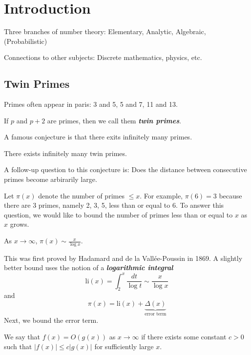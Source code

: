 



\section{Introduction}

Three branches of number theory: Elementary, Analytic, Algebraic, (Probabilistic)

Connections to other subjects: Discrete mathematics, physics, etc.

\subsection{Twin Primes}

Primes often appear in paris: 3 and 5, 5 and 7, 11 and 13.

\begin{definition}
    If $p$ and $p+2$ are primes, then we call them \textit{\textbf{twin primes}}.
\end{definition}

A famous conjecture is that there exits infinitely many primes.

\begin{conjecture}
    There exists infinitely many twin primes.
\end{conjecture}

A follow-up question to this conjecture is: Does the distance between consecutive primes become arbirarily large.

Let $\pi(x)$ denote the number of primes $\leq x$. For example, $\pi(6)=3$ because there are 3 primes, namely 2, 3, 5, less than or equal to 6. To answer this question, we would like to bound the number of primes less than or equal to $x$ as $x$ grows.

\begin{theorem}
    As $x \to \infty$, $\pi(x) \sim \frac{x}{\log x}$.
\end{theorem}

This was first proved by Hadamard and de la Vall\'ee-Poussin in 1869. A slightly better bound uses the notion of a \textit{\textbf{logarithmic integral}}
$$
\mathrm{li}(x) = \int_2^x \frac{dt}{\log t} \sim \frac{x}{\log x}
$$
and
$$
\pi(x) = \mathrm{li}(x) + \underbrace{\Delta(x)}_{\text{error term}}
$$
Next, we bound the error term.

\begin{definition}[Big-O]
    We say that $f(x) = O(g(x))$ as $x \to \infty$ if there exists some constant $c > 0$ such that $|f(x)| \leq c|g(x)|$ for sufficiently large $x$.
\end{definition}

